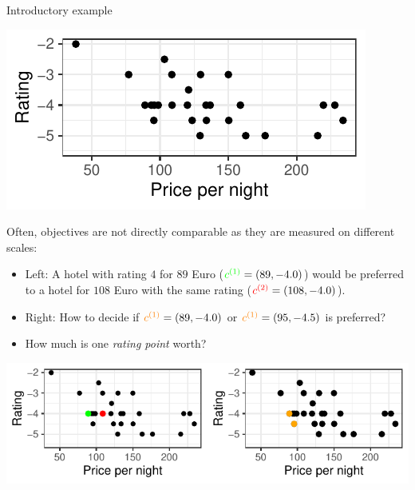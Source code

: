 \begin{frame}[allowframebreaks]{Introductory example}
\vspace*{0.2cm}

\begin{center}
\includegraphics[scale=1]{images/expedia-1-1}
\end{center}

\framebreak

Often, objectives are not directly comparable as they are measured on different scales:

\begin{itemize}
    \item Left: A hotel with rating $4$ for $89$ Euro ($\textcolor{green}{c^{(1)}} = \left(89, - 4.0\right)$) would be preferred to a hotel for $108$ Euro with the same rating ($\textcolor{red}{c^{(2)}} = \left(108, - 4.0\right)$).
\item Right: How to decide if $\textcolor{orange}{c^{(1)}} = \left(89, - 4.0\right)$ or $\textcolor{orange}{c^{(1)}} = \left(95, - 4.5\right)$ is preferred?
\item How much is one \textit{rating point} worth?
\end{itemize}

\centering \includegraphics[scale=1]{images/expedia-2-1}

\end{frame}



